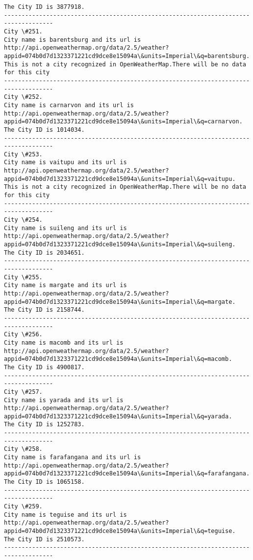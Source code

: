\documentclass[11pt]{article}
\begin{document}
\begin{Verbatim}[commandchars=\\\{\}]
The City ID is 3877918.
------------------------------------------------------------------------------------
City \#251.
City name is barentsburg and its url is http://api.openweathermap.org/data/2.5/weather?appid=074b0d7d1323371221cd9dce8e15094a\&units=Imperial\&q=barentsburg.
This is not a city recognized in OpenWeatherMap.There will be no data for this city
------------------------------------------------------------------------------------
City \#252.
City name is carnarvon and its url is http://api.openweathermap.org/data/2.5/weather?appid=074b0d7d1323371221cd9dce8e15094a\&units=Imperial\&q=carnarvon.
The City ID is 1014034.
------------------------------------------------------------------------------------
City \#253.
City name is vaitupu and its url is http://api.openweathermap.org/data/2.5/weather?appid=074b0d7d1323371221cd9dce8e15094a\&units=Imperial\&q=vaitupu.
This is not a city recognized in OpenWeatherMap.There will be no data for this city
------------------------------------------------------------------------------------
City \#254.
City name is suileng and its url is http://api.openweathermap.org/data/2.5/weather?appid=074b0d7d1323371221cd9dce8e15094a\&units=Imperial\&q=suileng.
The City ID is 2034651.
------------------------------------------------------------------------------------
City \#255.
City name is margate and its url is http://api.openweathermap.org/data/2.5/weather?appid=074b0d7d1323371221cd9dce8e15094a\&units=Imperial\&q=margate.
The City ID is 2158744.
------------------------------------------------------------------------------------
City \#256.
City name is macomb and its url is http://api.openweathermap.org/data/2.5/weather?appid=074b0d7d1323371221cd9dce8e15094a\&units=Imperial\&q=macomb.
The City ID is 4900817.
------------------------------------------------------------------------------------
City \#257.
City name is yarada and its url is http://api.openweathermap.org/data/2.5/weather?appid=074b0d7d1323371221cd9dce8e15094a\&units=Imperial\&q=yarada.
The City ID is 1252783.
------------------------------------------------------------------------------------
City \#258.
City name is farafangana and its url is http://api.openweathermap.org/data/2.5/weather?appid=074b0d7d1323371221cd9dce8e15094a\&units=Imperial\&q=farafangana.
The City ID is 1065158.
------------------------------------------------------------------------------------
City \#259.
City name is teguise and its url is http://api.openweathermap.org/data/2.5/weather?appid=074b0d7d1323371221cd9dce8e15094a\&units=Imperial\&q=teguise.
The City ID is 2510573.
------------------------------------------------------------------------------------

\end{Verbatim}
\end{document}
